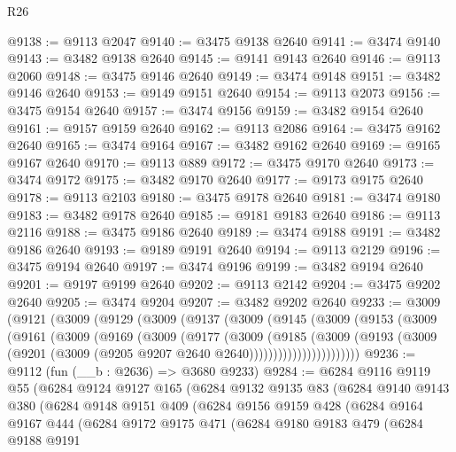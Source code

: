 \begin{lexlean}{R26}
\begin{coremodule}
@9138 := @9113 @2047
@9140 := @3475 @9138 @2640
@9141 := @3474 @9140
@9143 := @3482 @9138 @2640
@9145 := @9141 @9143 @2640
@9146 := @9113 @2060
@9148 := @3475 @9146 @2640
@9149 := @3474 @9148
@9151 := @3482 @9146 @2640
@9153 := @9149 @9151 @2640
@9154 := @9113 @2073
@9156 := @3475 @9154 @2640
@9157 := @3474 @9156
@9159 := @3482 @9154 @2640
@9161 := @9157 @9159 @2640
@9162 := @9113 @2086
@9164 := @3475 @9162 @2640
@9165 := @3474 @9164
@9167 := @3482 @9162 @2640
@9169 := @9165 @9167 @2640
@9170 := @9113 @889
@9172 := @3475 @9170 @2640
@9173 := @3474 @9172
@9175 := @3482 @9170 @2640
@9177 := @9173 @9175 @2640
@9178 := @9113 @2103
@9180 := @3475 @9178 @2640
@9181 := @3474 @9180
@9183 := @3482 @9178 @2640
@9185 := @9181 @9183 @2640
@9186 := @9113 @2116
@9188 := @3475 @9186 @2640
@9189 := @3474 @9188
@9191 := @3482 @9186 @2640
@9193 := @9189 @9191 @2640
@9194 := @9113 @2129
@9196 := @3475 @9194 @2640
@9197 := @3474 @9196
@9199 := @3482 @9194 @2640
@9201 := @9197 @9199 @2640
@9202 := @9113 @2142
@9204 := @3475 @9202 @2640
@9205 := @3474 @9204
@9207 := @3482 @9202 @2640
@9233 := @3009
    (@9121
      (@3009
        (@9129
          (@3009
            (@9137
              (@3009
                (@9145
                  (@3009
                    (@9153
                      (@3009
                        (@9161
                          (@3009
                            (@9169
                              (@3009
                                (@9177
                                  (@3009
                                    (@9185
                                      (@3009
                                        (@9193
                                          (@3009
                                            (@9201
                                              (@3009 (@9205 @9207 @2640 @2640)))))))))))))))))))))))
@9236 := @9112 (fun (__b : @2636) => @3680 @9233)
@9284 := @6284
    @9116
    @9119
    @55
    (@6284
      @9124
      @9127
      @165
      (@6284
        @9132
        @9135
        @83
        (@6284
          @9140
          @9143
          @380
          (@6284
            @9148
            @9151
            @409
            (@6284
              @9156
              @9159
              @428
              (@6284
                @9164
                @9167
                @444
                (@6284
                  @9172
                  @9175
                  @471
                  (@6284
                    @9180
                    @9183
                    @479
                    (@6284
                      @9188
                      @9191

\end{coremodule}
\end{lexlean}
